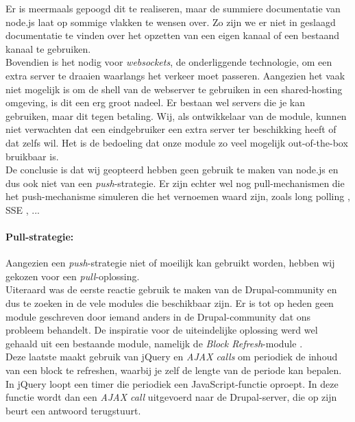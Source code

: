Er is meermaals gepoogd dit te realiseren, maar de summiere documentatie van node.js laat op sommige vlakken te wensen over. Zo zijn we er niet in geslaagd documentatie te vinden over het opzetten van een eigen kanaal of een bestaand kanaal te gebruiken.\\
Bovendien is het nodig voor \textit{websockets}, de onderliggende technologie, om een extra server te draaien waarlangs het verkeer moet passeren. Aangezien het vaak niet mogelijk is om de shell van de webserver te gebruiken in een shared-hosting omgeving, is dit een erg groot nadeel. Er bestaan wel servers die je kan gebruiken, maar dit tegen betaling. Wij, als ontwikkelaar van de module, kunnen niet verwachten dat een eindgebruiker een extra server ter beschikking heeft of dat zelfs wil. Het is de bedoeling dat onze module zo veel mogelijk out-of-the-box bruikbaar is.\\

De conclusie is dat wij geopteerd hebben geen gebruik te maken van node.js en dus ook niet van een \textit{push}-strategie. Er zijn echter wel nog pull-mechanismen die het push-mechanisme simuleren die het vernoemen waard zijn, zoals long polling \cite{longPolling}, SSE \cite{SSE}, ...
\newpage
\paragraph{Pull-strategie: }

Aangezien een \textit{push}-strategie niet of moeilijk kan gebruikt worden, hebben wij gekozen voor een \textit{pull}-oplossing.\\

Uiteraard was de eerste reactie gebruik te maken van de Drupal-community en dus te zoeken in de vele modules die beschikbaar zijn. Er is tot op heden geen module geschreven door iemand anders in de Drupal-community dat ons probleem behandelt. De inspiratie voor de uiteindelijke oplossing werd wel gehaald uit een bestaande module, namelijk de \textit{Block Refresh}-module \cite{blockRefreshModule}.\\
Deze laatste maakt gebruik van jQuery en \textit{AJAX calls} om periodiek de inhoud van een block te refreshen, waarbij je zelf de lengte van de periode kan bepalen. In jQuery loopt een timer die periodiek een JavaScript-functie oproept. In deze functie wordt dan een \textit{AJAX call} uitgevoerd naar de Drupal-server, die op zijn beurt een antwoord terugstuurt.\\

